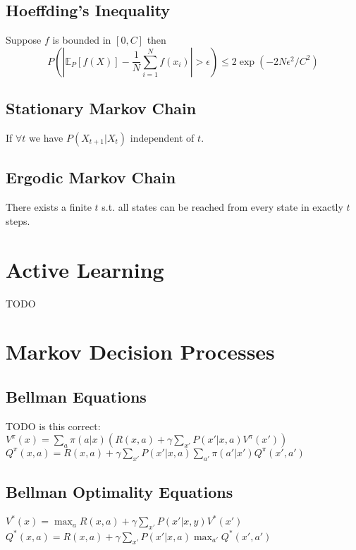 \documentclass[11pt]{article}
\newcommand{\E}{\mathbb{E}}
\begin{document}
\begin{multicols*}{3}
\subsection*{Hoeffding's Inequality}
Suppose $f$ is bounded in $\left[0,C\right]$ then $$P\left(| \E_P\left[f(X)\right] - \frac{1}{N} \sum_{i=1}^{N} f(x_i)| > \epsilon \right) \leq 2 \exp\left(-2N\epsilon^2/C^2\right)$$
\subsection*{Stationary Markov Chain}
If $\forall t$ we have $P(X_{t+1} | X_{t})$ independent of $t$.
\subsection*{Ergodic Markov Chain}
There exists a finite $t$ s.t. all states can be reached from every state in exactly $t$ steps.























\section*{Active Learning}


TODO



\section*{Markov Decision Processes}

\subsection*{Bellman Equations} TODO is this correct:
$V^\pi(x) = \sum_a \pi(a|x) (R(x,a) + \gamma \sum_{x'} P(x'|x,a) V^\pi (x'))$\\
$Q^\pi(x,a) = R(x,a) + \gamma \sum_{x'} P(x'|x,a) \sum_{a'} \pi(a'|x')Q^\pi(x',a')$
\subsection*{Bellman Optimality Equations}
$V^*(x) = \max_a R(x,a) + \gamma \sum_{x'} P(x' | x,y) V^*(x')$\\
$Q^*(x,a) = R(x,a) + \gamma \sum_{x'}P(x'|x,a) \max_{a'} Q^*(x',a')$

\end{multicols*}
\end{document}
